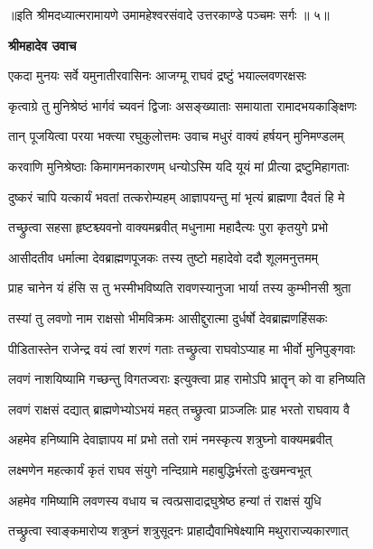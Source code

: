 {॥इति श्रीमदध्यात्मरामायणे उमामहेश्वरसंवादे उत्तरकाण्डे
पञ्चमः सर्गः ॥ ५॥
}




\textbf{श्रीमहादेव उवाच}

\twolineshloka
{एकदा मुनयः सर्वे यमुनातीरवासिनः}
{आजग्मू राघवं द्रष्टुं भयाल्लवणरक्षसः} %

\twolineshloka
{कृत्वाग्रे तु मुनिश्रेष्ठं भार्गवं च्यवनं द्विजाः}
{असङ्ख्याताः समायाता रामादभयकाङ्क्षिणः} %

\twolineshloka
{तान् पूजयित्वा परया भक्त्या रघुकुलोत्तमः}
{उवाच मधुरं वाक्यं हर्षयन् मुनिमण्डलम्} %

\twolineshloka
{करवाणि मुनिश्रेष्ठाः किमागमनकारणम्}
{धन्योऽस्मि यदि यूयं मां प्रीत्या द्रष्टुमिहागताः} %

\twolineshloka
{दुष्करं चापि यत्कार्यं भवतां तत्करोम्यहम्}
{आज्ञापयन्तु मां भृत्यं ब्राह्मणा दैवतं हि मे} %

\twolineshloka
{तच्छ्रुत्वा सहसा हृष्टश्च्यवनो वाक्यमब्रवीत्}
{मधुनामा महादैत्यः पुरा कृतयुगे प्रभो} %

\twolineshloka
{आसीदतीव धर्मात्मा देवब्राह्मणपूजकः}
{तस्य तुष्टो महादेवो ददौ शूलमनुत्तमम्} %

\twolineshloka
{प्राह चानेन यं हंसि स तु भस्मीभविष्यति}
{रावणस्यानुजा भार्या तस्य कुम्भीनसी श्रुता} %

\twolineshloka
{तस्यां तु लवणो नाम राक्षसो भीमविक्रमः}
{आसीद्दुरात्मा दुर्धर्षो देवब्राह्मणहिंसकः} %

\twolineshloka
{पीडितास्तेन राजेन्द्र वयं त्वां शरणं गताः}
{तच्छ्रुत्वा राघवोऽप्याह मा भीर्वो मुनिपुङ्गवाः} %

\twolineshloka
{लवणं नाशयिष्यामि गच्छन्तु विगतज्वराः}
{इत्युक्त्वा प्राह रामोऽपि भ्रातॄन् को वा हनिष्यति} %

\twolineshloka
{लवणं राक्षसं दद्यात् ब्राह्मणेभ्योऽभयं महत्}
{तच्छ्रुत्वा प्राञ्जलिः प्राह भरतो राघवाय वै} %

\twolineshloka
{अहमेव हनिष्यामि देवाज्ञापय मां प्रभो}
{ततो रामं नमस्कृत्य शत्रुघ्नो वाक्यमब्रवीत्} %

\twolineshloka
{लक्ष्मणेन महत्कार्यं कृतं राघव संयुगे}
{नन्दिग्रामे महाबुद्धिर्भरतो दुःखमन्वभूत्} %

\twolineshloka
{अहमेव गमिष्यामि लवणस्य वधाय च}
{त्वत्प्रसादाद्रघुश्रेष्ठ हन्यां तं राक्षसं युधि} %

\twolineshloka
{तच्छ्रुत्वा स्वाङ्कमारोप्य शत्रुघ्नं शत्रुसूदनः}
{प्राहाद्यैवाभिषेक्ष्यामि मथुराराज्यकारणात्} %

